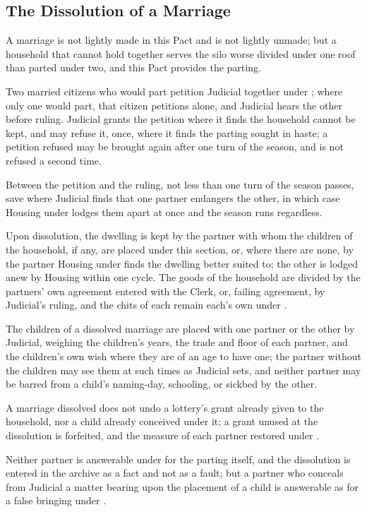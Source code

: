 \begin{setclose}
\section{The Dissolution of a Marriage}
\label{sec:marriage:dissolution-of-a-marriage}

A marriage is not lightly made in this Pact and is not lightly unmade; but a household that cannot hold together serves the silo worse divided under one roof than parted under two, and this Pact provides the parting.

\begin{clauses}
\item Two married citizens who would part petition Judicial together under ; where only one would part, that citizen petitions alone, and Judicial hears the other before ruling. Judicial grants the petition where it finds the household cannot be kept, and may refuse it, once, where it finds the parting sought in haste; a petition refused may be brought again after one turn of the season, and is not refused a second time.
\item Between the petition and the ruling, not less than one turn of the season passes, save where Judicial finds that one partner endangers the other, in which case Housing under  lodges them apart at once and the season runs regardless.
\item Upon dissolution, the dwelling is kept by the partner with whom the children of the household, if any, are placed under this section, or, where there are none, by the partner Housing under  finds the dwelling better suited to; the other is lodged anew by Housing within one cycle. The goods of the household are divided by the partners' own agreement entered with the Clerk, or, failing agreement, by Judicial's ruling, and the chits of each remain each's own under .
\item The children of a dissolved marriage are placed with one partner or the other by Judicial, weighing the children's years, the trade and floor of each partner, and the children's own wish where they are of an age to have one; the partner without the children may see them at such times as Judicial sets, and neither partner may be barred from a child's naming-day, schooling, or sickbed by the other.
\item A marriage dissolved does not undo a lottery's grant already given to the household, nor a child already conceived under it; a grant unused at the dissolution is forfeited, and the measure of each partner restored under .
\item Neither partner is answerable under  for the parting itself, and the dissolution is entered in the archive as a fact and not as a fault; but a partner who conceals from Judicial a matter bearing upon the placement of a child is answerable as for a false bringing under .
\end{clauses}


\end{setclose}
